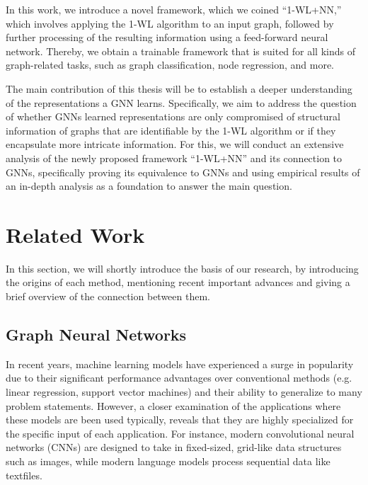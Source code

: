 \documentclass[11pt, dvipsnames, DIV=12]{scrreprt}
\theoremstyle{definition}
\begin{document}
In this work, we introduce a novel framework, which we coined ``1-WL+NN,'' which involves applying the 1-WL algorithm to an input graph, followed by further processing of the resulting information using a feed-forward neural network. Thereby, we obtain a trainable framework that is suited for all kinds of graph-related tasks, such as graph classification, node regression, and more.

The main contribution of this thesis will be to establish a deeper understanding of the representations a GNN learns. Specifically, we aim to address the question of whether GNNs learned representations are only compromised of structural information of graphs that are identifiable by the 1-WL algorithm or if they encapsulate more intricate information.
For this, we will conduct an extensive analysis of the newly proposed framework ``1-WL+NN'' and its connection to GNNs, specifically proving its equivalence to GNNs and using empirical results of an in-depth analysis as a foundation to answer the main question.

\section{Related Work}
In this section, we will shortly introduce the basis of our research, by introducing the origins of each method, mentioning recent important advances and giving a brief overview of the connection between them.

\subsection{Graph Neural Networks}
In recent years, machine learning models have experienced a surge in popularity due to their significant performance advantages over conventional methods (e.g. linear regression, support vector machines) and their ability to generalize to many problem statements. However, a closer examination of the applications where these models are been used typically, reveals that they are highly specialized for the specific input of each application. For instance, modern convolutional neural networks (CNNs) are designed to take in fixed-sized, grid-like data structures such as images, while modern language models process sequential data like textfiles.
\end{document}
